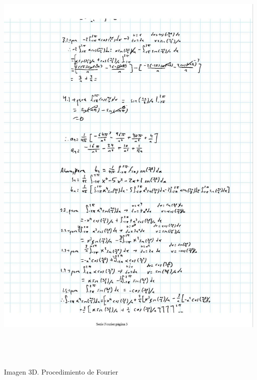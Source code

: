 \includegraphics[width=6.26772in,height=8.11111in]{media/image55.jpg}

Imagen 3D. Procedimiento de Fourier

